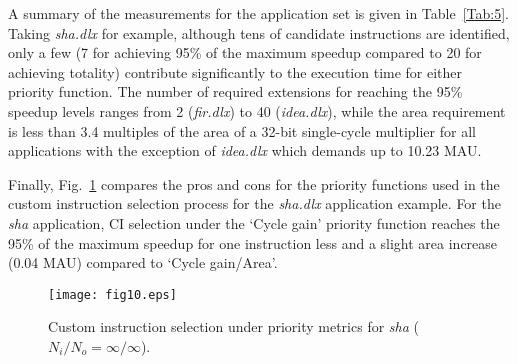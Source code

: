\documentclass{comjnl}
\begin{document}
A summary of the measurements for the application set is given in Table~\ref{Tab:5}. 
Taking {\it sha.dlx} for example, although tens of candidate instructions are identified, 
only a few (7 for achieving 95\% of the maximum speedup compared to 20 for achieving totality) contribute significantly to the execution time for either priority function. The 
number of required extensions for reaching the 95\% speedup levels ranges from 2 ({\it fir.dlx}) to 40 ({\it idea.dlx}), while the area requirement is less than 3.4 multiples of the area of a 32-bit single-cycle multiplier for all applications with the exception of {\it idea.dlx} which demands up to 10.23 MAU. 

Finally, Fig.~\ref{Fig:10} compares the pros and cons for the priority functions 
used in the custom instruction selection process for the {\it sha.dlx} application example. For the {\it sha} application, CI selection under the `Cycle gain' priority function reaches the 95\% of the maximum speedup for one instruction less and a slight area increase (0.04 MAU) compared to `Cycle gain/Area'.

\begin{figure}[tb]
  \centering
  \texttt{[image: fig10.eps]}
  \caption{Custom instruction selection under priority metrics for {\it sha}
  ($N_{i}/N_{o}=\infty/\infty$).}
  \label{Fig:10}
  \vspace{-0.175cm}
\end{figure}
\end{document}
